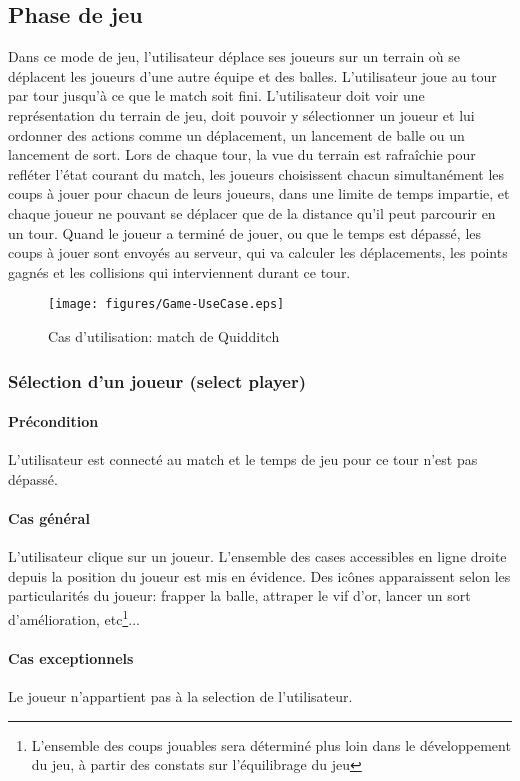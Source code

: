 \subsection{Phase de jeu}
Dans ce mode de jeu, l'utilisateur déplace ses joueurs sur un terrain où se
déplacent les joueurs d'une autre équipe et des balles. L'utilisateur joue au
tour par tour jusqu'à ce que le match soit fini. L'utilisateur doit voir une 
représentation du terrain de jeu, doit pouvoir y sélectionner un joueur et lui 
ordonner des actions comme un déplacement, un lancement de balle ou un lancement 
de sort. Lors de chaque tour, la vue du terrain est rafraîchie pour refléter 
l'état courant du match, les joueurs choisissent chacun simultanément les coups
à jouer pour chacun de leurs joueurs, dans une limite de temps impartie, et 
chaque joueur ne pouvant se déplacer que de la distance qu'il peut parcourir en
un tour. Quand le joueur a terminé de jouer, ou que le temps est dépassé, les
coups à jouer sont envoyés au serveur, qui va calculer les déplacements, les 
points gagnés et les collisions qui interviennent durant ce tour.

\begin{figure}[h!]
    \centering
    \texttt{[image: figures/Game-UseCase.eps]}
    \caption{\label{fig:UC:game} Cas d'utilisation: match de Quidditch}
\end{figure}

\subsubsection{Sélection d'un joueur (select player)}
    \label{UC:selectPlayerOnPitch}
    \paragraph{Précondition} L'utilisateur est connecté au match et le temps de jeu pour ce tour n'est pas dépassé.
    \paragraph{Cas général} L'utilisateur clique sur un joueur. L'ensemble des cases accessibles en ligne droite depuis la position du joueur est mis en évidence. Des icônes apparaissent selon les particularités du joueur: frapper la balle, attraper le vif d'or, lancer un sort d'amélioration, etc\footnote{L'ensemble des coups jouables sera déterminé plus loin dans le développement du jeu, à partir des constats sur l'équilibrage du jeu}...
    \paragraph{Cas exceptionnels} Le \gls{joueur} n'appartient pas à la \gls{selection} de l'\gls{utilisateur}.
